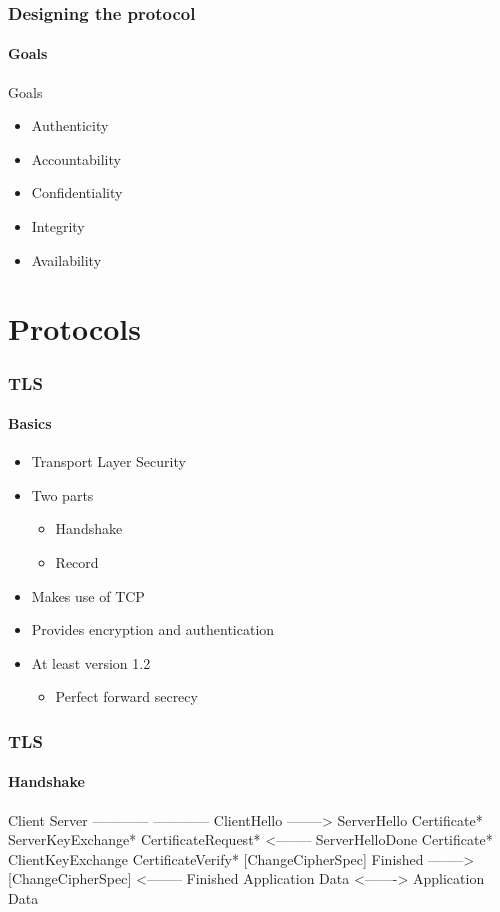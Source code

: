 \documentclass[hyperref={urlcolor=black, citecolor=black, pdfpagemode=UseNone, pdfpagelayout=SinglePage, pdfstartview=}]{beamer}
\begin{document}
\begin{frame}
  \frametitle{Designing the protocol}
  \framesubtitle{Goals}
  \begin{block}{Goals}
    \begin{itemize}
      \item Authenticity
      \item Accountability
      \item Confidentiality
      \item Integrity
      \item \scriptsize Availability
    \end{itemize}
  \end{block}
\end{frame}

\section{Protocols}
\begin{frame}
  \frametitle{TLS}
  \framesubtitle{Basics}
  \begin{itemize}
    \item Transport Layer Security
    \item Two parts
    \begin{itemize}
      \item Handshake
      \item Record
    \end{itemize}
    \item Makes use of TCP
    \item Provides encryption and authentication
    \item At least version 1.2
    \begin{itemize}
      \item Perfect forward secrecy
    \end{itemize}
  \end{itemize}  
\end{frame}

\begin{frame}[fragile]
  \frametitle{TLS}
  \framesubtitle{Handshake}
\scriptsize
  \begin{semiverbatim}
{\large Client}                                     {\large Server}
------------                                   ------------
ClientHello              -------->
                                                ServerHello
                                               Certificate*
                                         ServerKeyExchange*                
                                        CertificateRequest*
                         <--------          ServerHelloDone
Certificate*
ClientKeyExchange
CertificateVerify*
[ChangeCipherSpec]
Finished                 -------->
                                         [ChangeCipherSpec]
                         <--------                 Finished
Application Data         <------->         Application Data
\end{semiverbatim}
\end{frame}
\end{document}
